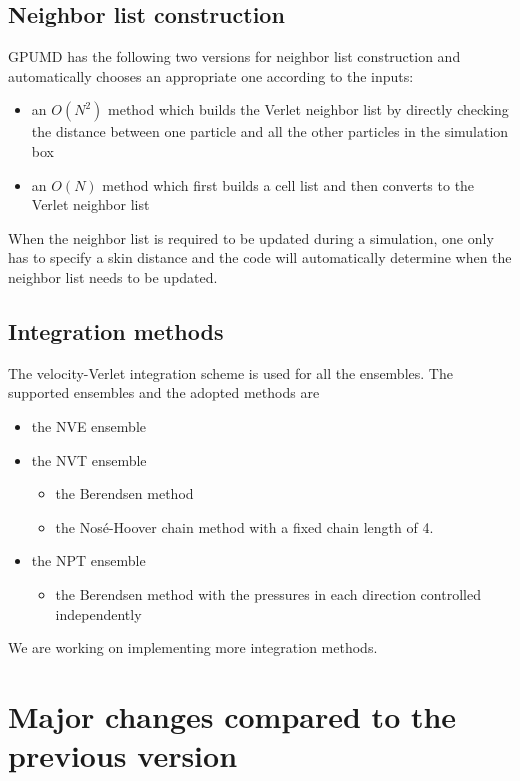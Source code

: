\documentclass[12pt,a4paper]{report}
\begin{document}
\subsection{Neighbor list construction}

GPUMD has the following two versions for neighbor list construction and automatically chooses an appropriate one according to the inputs:
  \begin{itemize}
  \item an $O(N^2)$ method which builds the Verlet neighbor list by directly checking the distance between one particle and all the other particles in the simulation box
  \item an $O(N)$ method which first builds a cell list and then converts to the Verlet neighbor list
  \end{itemize}
When the neighbor list is required to be updated during a simulation, one only has to specify a skin distance and the code will automatically determine when the neighbor list needs to be updated.

\subsection{Integration methods}

The velocity-Verlet \cite{swope1982jcp} integration scheme is used for all the ensembles.
The supported ensembles and the adopted methods are
  \begin{itemize}
  \item the NVE ensemble
  \item the NVT ensemble
    \begin{itemize}
    \item the Berendsen method  \cite{berendsen1984jcp}
    \item the Nos\'{e}-Hoover chain method \cite{nose1984jcp,hoover1985pra,martyna1992jcp,martyna1996mp,tuckerman2010}
        with a fixed chain length of 4.
    \end{itemize}
  \item the NPT ensemble
    \begin{itemize}
    \item the Berendsen method  \cite{berendsen1984jcp} with the pressures in each direction controlled independently
    \end{itemize}
  \end{itemize}

We are working on implementing more integration methods.

\section{Major changes compared to the previous version}
\end{document}

